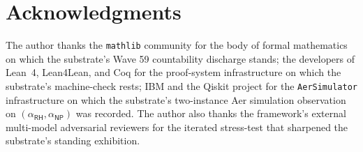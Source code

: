 \documentclass[11pt,a4paper]{amsart}
\theoremstyle{plain}
\theoremstyle{definition}
\begin{document}
\section*{Acknowledgments}

The author thanks the \texttt{mathlib} community for the body of formal mathematics on which the substrate's Wave 59 countability discharge stands; the developers of Lean~4, Lean4Lean, and Coq for the proof-system infrastructure on which the substrate's machine-check rests; IBM and the Qiskit project for the \texttt{AerSimulator} infrastructure on which the substrate's two-instance Aer simulation observation on $(\alpha_{\textsf{RH}},\alpha_{\textsf{NP}})$ was recorded. The author also thanks the framework's external multi-model adversarial reviewers for the iterated stress-test that sharpened the substrate's standing exhibition.

\end{document}
